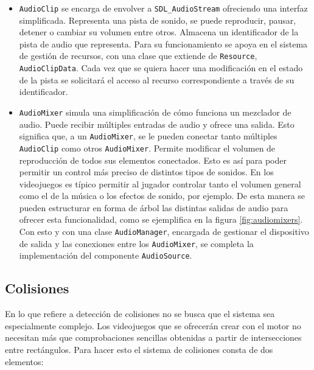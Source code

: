 \begin{itemize}
	\item \texttt{AudioClip} se encarga de envolver a \texttt{SDL\_AudioStream} ofreciendo una interfaz simplificada. Representa una pista de sonido, se puede reproducir, pausar, detener o cambiar su volumen entre otros. Almacena un identificador de la pista de audio que representa. Para su funcionamiento se apoya en el sistema de gestión de recursos, con una clase que extiende de \texttt{Resource}, \texttt{AudioClipData}. Cada vez que se quiera hacer una modificación en el estado de la pista se solicitará el acceso al recurso correspondiente a través de su identificador.
	\item \texttt{AudioMixer} simula una simplificación de cómo funciona un mezclador de audio. Puede recibir múltiples entradas de audio y ofrece una salida. Esto significa que, a un \texttt{AudioMixer}, se le pueden conectar tanto múltiples \texttt{AudioClip} como otros \texttt{AudioMixer}. Permite modificar el volumen de reproducción de todos sus elementos conectados. Esto es así para poder permitir un control más preciso de distintos tipos de sonidos. En los videojuegos es típico permitir al jugador controlar tanto el volumen general como el de la música o los efectos de sonido, por ejemplo. De esta manera se pueden estructurar en forma de árbol las distintas salidas de audio para ofrecer esta funcionalidad, como se ejemplifica en la figura \ref{fig:audiomixers}. Con esto y con una clase \texttt{AudioManager}, encargada de gestionar el dispositivo de salida y las conexiones entre los \texttt{AudioMixer}, se completa la implementación del componente \texttt{AudioSource}.
\end{itemize}


\subsection{Colisiones}
En lo que refiere a detección de colisiones no se busca que el sistema sea especialmente complejo. Los videojuegos que se ofrecerán crear con el motor no necesitan más que comprobaciones sencillas obtenidas a partir de intersecciones entre rectángulos. Para hacer esto el sistema de colisiones consta de dos elementos: 

